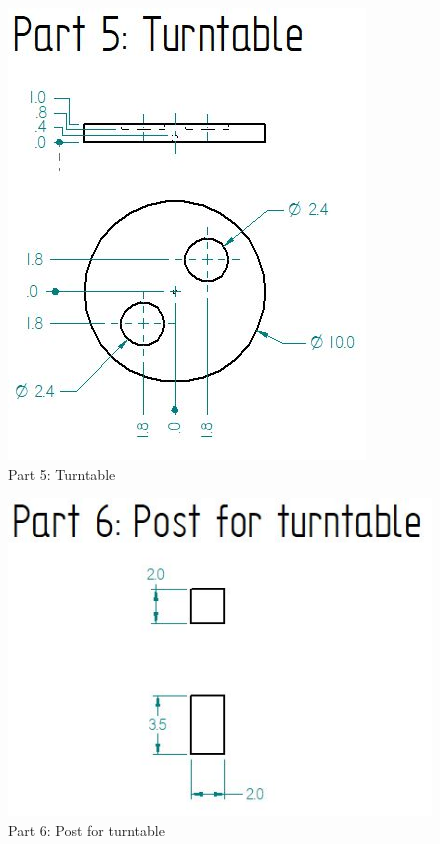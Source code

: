\documentclass[12pt, titlepage]{article}
\begin{document}
\begin{figure}[H]
    \centerline{\includegraphics[scale=.5]{Part 5.jpg}}
    \caption{Part 5: Turntable}
    \label{fig}
\end{figure}

\begin{figure}[H]
    \centerline{\includegraphics[scale=.5]{Part 6.jpg}}
    \caption{Part 6: Post for turntable}
    \label{fig}
\end{figure}
\end{document}
